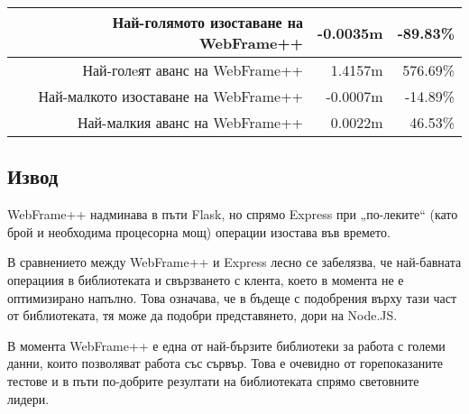 \documentclass[documentation.tex]{subfiles}
\begin{document}
\begin{longtable}{|r|r|r|r|r|}
    \multicolumn{3}{|r|}{Най-голямото изоставане на WebFrame++} & {\color[HTML]{FF0000} -0.0035m} & {\color[HTML]{FF0000} -89.83\%} \\ \hline
    \multicolumn{3}{|r|}{Най-голeят аванс на WebFrame++}        & {\color[HTML]{32CB00} 1.4157m}  & {\color[HTML]{32CB00} 576.69\%} \\ \hline
    \multicolumn{3}{|r|}{Най-малкото изоставане на WebFrame++}  & {\color[HTML]{FF0000} -0.0007m} & {\color[HTML]{FF0000} -14.89\%} \\ \hline
    \multicolumn{3}{|r|}{Най-малкия аванс на WebFrame++}        & {\color[HTML]{32CB00} 0.0022m}  & {\color[HTML]{32CB00} 46.53\%}  \\ \hline
    
    \end{longtable}
    
\subsection{Извод}
    \begin{text} \par
        WebFrame++\cite{webframe} надминава в пъти Flask, но спрямо Express при „по-леките“ (като брой и необходима процесорна мощ) операции изостава във времето. 
    \end{text}
    \begin{text} \par
        В сравнението между WebFrame++\cite{webframe} и Express лесно се забелязва, че най-бавната операциия в библиотеката и свързването с клента, което в момента не е оптимизирано напълно. Това означава, че в бъдеще с подобрения върху тази част от библиотеката, тя може да подобри представянето, дори на Node.JS. 
    \end{text}
    \begin{text} \par
        В момента WebFrame++\cite{webframe} е една от най-бързите библиотеки за работа с големи данни, които позволяват работа със сървър. Това е очевидно от горепоказаните тестове и в пъти по-добрите резултати на библиотеката спрямо световните лидери. 
    \end{text}
\end{document}
